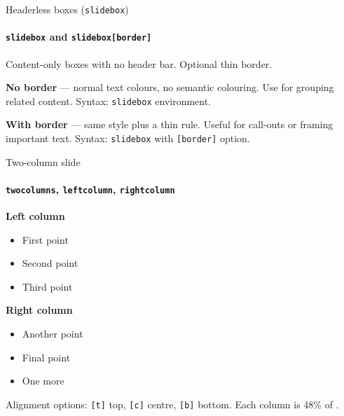 \documentclass[sans,numeric,titlesplit]{qslides}
\begin{document}
\begin{frame}{Headerless boxes (\texttt{slidebox})}
  \framesubtitle{\texttt{slidebox} and \texttt{slidebox[border]}}
  Content-only boxes with no header bar. Optional thin border.
  \begin{slidebox}
    \textbf{No border} --- normal text colours, no semantic colouring.
    Use for grouping related content.
    Syntax: \texttt{slidebox} environment.
  \end{slidebox}
  \begin{slidebox}[border]
    \textbf{With border} --- same style plus a thin rule.
    Useful for call-outs or framing important text.
    Syntax: \texttt{slidebox} with \texttt{[border]} option.
  \end{slidebox}
\end{frame}

\begin{frame}{Two-column slide}
  \framesubtitle{\texttt{twocolumns}, \texttt{leftcolumn}, \texttt{rightcolumn}}
  \begin{twocolumns}[t]
    \begin{leftcolumn}
      \textbf{Left column}
      \begin{itemize}
        \item First point
        \item Second point
        \item Third point
      \end{itemize}
    \end{leftcolumn}
    \begin{rightcolumn}
      \textbf{Right column}
      \begin{itemize}
        \item Another point
        \item Final point
        \item One more
      \end{itemize}
    \end{rightcolumn}
  \end{twocolumns}
  \vspace{1ex}
  Alignment options: \texttt{[t]} top, \texttt{[c]} centre, \texttt{[b]} bottom.
  Each column is 48\% of \texttt{\string\linewidth}.
\end{frame}
\end{document}
